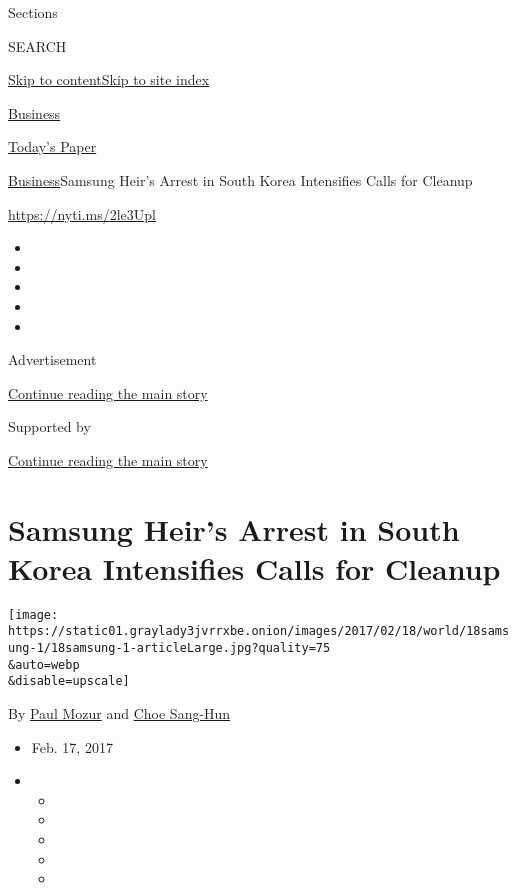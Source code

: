 Sections

SEARCH

\protect\hyperlink{site-content}{Skip to
content}\protect\hyperlink{site-index}{Skip to site index}

\href{https://www.nytimes3xbfgragh.onion/section/business}{Business}

\href{https://myaccount.nytimes3xbfgragh.onion/auth/login?response_type=cookie\&client_id=vi}{}

\href{https://www.nytimes3xbfgragh.onion/section/todayspaper}{Today's
Paper}

\href{/section/business}{Business}\textbar{}Samsung Heir's Arrest in
South Korea Intensifies Calls for Cleanup

\url{https://nyti.ms/2le3Upl}

\begin{itemize}
\item
\item
\item
\item
\item
\end{itemize}

Advertisement

\protect\hyperlink{after-top}{Continue reading the main story}

Supported by

\protect\hyperlink{after-sponsor}{Continue reading the main story}

\hypertarget{samsung-heirs-arrest-in-south-korea-intensifies-calls-for-cleanup}{%
\section{Samsung Heir's Arrest in South Korea Intensifies Calls for
Cleanup}\label{samsung-heirs-arrest-in-south-korea-intensifies-calls-for-cleanup}}

\texttt{[image: https://static01.graylady3jvrrxbe.onion/images/2017/02/18/world/18samsung-1/18samsung-1-articleLarge.jpg?quality=75\\\&auto=webp\\\&disable=upscale]}

By \href{https://www.nytimes3xbfgragh.onion/by/paul-mozur}{Paul Mozur}
and \href{http://www.nytimes3xbfgragh.onion/by/choe-sang-hun}{Choe
Sang-Hun}

\begin{itemize}
\item
  Feb. 17, 2017
\item
  \begin{itemize}
  \item
  \item
  \item
  \item
  \item
  \end{itemize}
\end{itemize}

